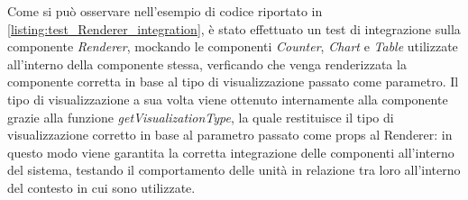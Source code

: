 Come si può osservare nell'esempio di codice riportato in \ref{listing:test_Renderer_integration}, è stato effettuato un test di integrazione sulla componente \textit{Renderer},
mockando le componenti \textit{Counter}, \textit{Chart} e \textit{Table} utilizzate all'interno della componente stessa, verficando che venga renderizzata
la componente corretta in base al tipo di visualizzazione passato come parametro. \newline
Il tipo di visualizzazione a sua volta viene ottenuto internamente alla componente grazie alla funzione \textit{getVisualizationType}, la quale restituisce il tipo di visualizzazione
corretto in base al parametro passato come props al Renderer: in questo modo viene garantita la corretta integrazione delle componenti all'interno del sistema, testando il comportamento
delle unità in relazione tra loro all'interno del contesto in cui sono utilizzate.